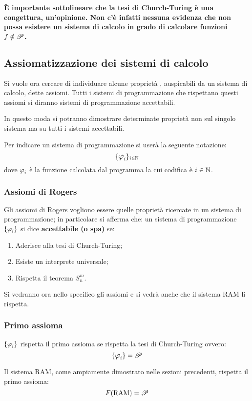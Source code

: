 \textbf{È importante sottolineare che la tesi di Church-Turing è una congettura, 
un'opinione. Non c'è infatti nessuna evidenza che non possa esistere un sistema di 
calcolo in grado di calcolare funzioni $f\notin\mathscr{P}$.}

\subsection{Assiomatizzazione dei sistemi di calcolo}
Si vuole ora cercare di individuare alcune proprietà , auspicabili da 
un sistema di calcolo, dette assiomi. Tutti i sistemi di programmazione che rispettano
questi assiomi si diranno sistemi di programmazione accettabili.

In questo moda si potranno dimostrare determinate proprietà non sul singolo sistema
ma su tutti i sistemi accettabili.

Per indicare un sistema di programmazione si userà la seguente notazione:
$$ \sistProg_{i\in\N} $$
dove $\semanticaRAM_i$ è la funzione calcolata dal programma la cui codifica è 
$i\in\mathbb{N}$.

\subsubsection{Assiomi di Rogers}
Gli assiomi di Rogers vogliono essere quelle  proprietà ricercate in
un sistema di programmazione; in particolare si afferma che: un sistema di
programmazione $\sistProg$ si dice \textbf{accettabile (o spa)} se: 
\begin{enumerate}
    \item Aderisce alla tesi di Church-Turing;
    \item Esiste un interprete universale;
    \item Rispetta il teorema $S_n^m$.
\end{enumerate}

Si vedranno ora nello specifico gli assiomi e si vedrà anche che il sistema RAM
li rispetta.

\subsubsection*{Primo assioma}
$\sistProg$ rispetta il primo assioma se rispetta la tesi di Church-Turing
ovvero:
$$ \sistProg =\ricPar $$

Il sistema RAM, come ampiamente dimostrato nelle sezioni precedenti, rispetta
il primo assioma:
$$ F(\text{RAM})=\mathscr{P} $$

